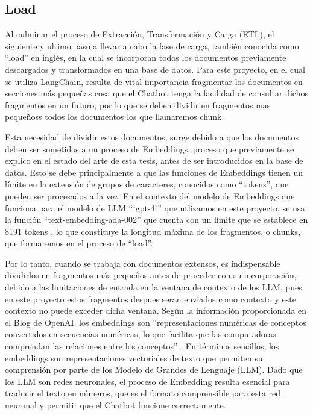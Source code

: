 \newpage

\subsection{Load}

\par Al culminar el proceso de Extracción, Transformación y Carga (ETL), el siguiente y ultimo paso a llevar a cabo la fase de carga, 
también conocida como ``load'' en inglés, en la cual se incorporan todos los documentos previamente descargados y transformados 
en una base de datos. Para este proyecto, en el cual se utiliza LangChain, resulta de vital importancia fragmentar los documentos 
en secciones más pequeñas cosa que el Chatbot tenga la facilidad de consultar dichos fragmentos en un futuro, por lo que se deben dividir en fragmentos
mas pequeñoss todos los documentos los que llamaremos chunk.

\par Esta necesidad de dividir estos documentos, surge debido a que los documentos deben ser sometidos a un proceso de Embeddings, proceso que
previamente se explico en el estado del arte de esta tesis, antes de ser 
introducidos en la base de datos. Esto se debe principalmente a que las funciones de Embeddings tienen un límite en la extensión 
de grupos de caracteres, conocidos como ``tokens'', que pueden ser procesados a la vez. En el contexto del modelo de Embeddings que funciona
para el modelo de LLM ```gpt-4''' que utlizamos en este proyecto, se usa la función
``text-embedding-ada-002'' que cuenta con un límite que se establece en 8191 tokens \cite{openai1}, lo que constituye la longitud máxima de los fragmentos, o chunks, que
formaremos en el proceso de ``load''.

\par Por lo tanto, cuando se trabaja con documentos extensos, es indispensable dividirlos en fragmentos más pequeños antes de proceder 
con su incorporación, debido a las limitaciones de entrada en la ventana de contexto de los LLM, pues en este proyecto estos fragmentos despues seran enviados como contexto y este contexto no puede exceder dicha ventana. Según la información proporcionada en el Blog de OpenAI, los embeddings son ``representaciones numéricas 
de conceptos convertidos en secuencias numéricas, lo que facilita que las computadoras comprendan las relaciones entre los 
conceptos'' \cite{openai1}. En términos sencillos, los embeddings son representaciones vectoriales de texto que permiten su comprensión por 
parte de los Modelo de Grandes de Lenguaje (LLM). Dado que los LLM son redes neuronales, el proceso de Embedding resulta 
esencial para traducir el texto en números, que es el formato comprensible para esta red neuronal y permitir que el Chatbot funcione 
correctamente.


